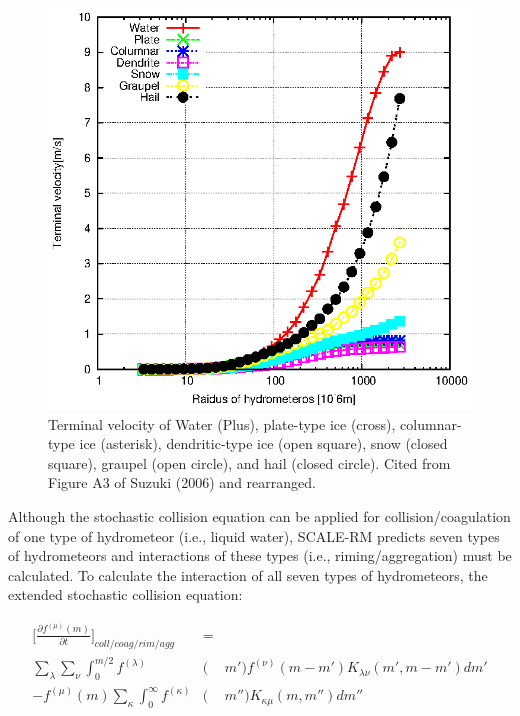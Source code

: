 \begin{figure}[ht]
\begin{center}
\includegraphics[scale=0.9]{./figure/terminal-velocity.eps}
\end{center}
\caption{Terminal velocity of Water (Plus), plate-type ice (cross), columnar-type ice (asterisk), dendritic-type ice (open square), snow (closed square), graupel (open circle), and hail (closed circle). Cited from Figure A3 of Suzuki (2006)\cite{suzuki_2006} and rearranged.}
\label{figs10-term}
\end{figure}


Although the stochastic collision equation can be applied for collision/coagulation of one type of hydrometeor (i.e., liquid water), SCALE-RM predicts seven types of hydrometeors and interactions of these types (i.e., riming/aggregation) must be calculated. To calculate the interaction of all seven types of hydrometeors, the extended stochastic collision equation:

\begin{eqnarray}
\Bigr[\frac{\partial f^{(\mu)}(m)}{\partial t}\Bigr]_{coll/coag/rim/agg}&=&\nonumber\\
\sum_{\lambda}\sum_{\nu}\int_{0}^{m/2}f^{(\lambda)}&(&m')f^{(\nu)}(m-m')K_{\lambda\nu}(m',m-m')dm' \nonumber\\
-f^{(\mu)}(m)\sum_{\kappa}\int_0^{\infty}f^{(\kappa)}&(&m'')K_{\kappa\mu}(m,m'')dm''\label{s10-16}
\end{eqnarray}

